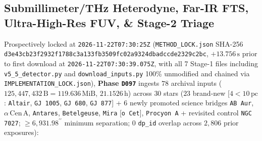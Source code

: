 \documentclass[twocolumn,10pt]{article}
\begin{document}
\subsection{Submillimeter/THz Heterodyne, Far-IR FTS, Ultra-High-Res FUV, \& Stage-2 Triage}
Prospectively locked at \texttt{2026-11-22T07:30:25Z} (\texttt{METHOD\_LOCK.json} SHA-256 \texttt{d3e43cb2\allowbreak 3f2932f1\allowbreak 788c3a13\allowbreak 3fb3509f\allowbreak c02a9324\allowbreak dbadccde\allowbreak 2329c2bc}, $+13.756\,\text{s}$ prior to first download at \texttt{2026-11-22T07:30:39.075Z}, with all 7 Stage-1 files including \texttt{v5\_5\_detector.py} and \texttt{download\_inputs.py} 100\% unmodified and chained via \texttt{IMPLEMENTATION\_LOCK.json}), \textbf{Phase \texttt{D097}} ingests $78$ archival inputs ($125{,}447{,}432\,\text{B} = 119.636\,\text{MiB}$, $21.1526\,\text{h}$) across $30$ stars ($23$ brand-new [$4 < 10\,\text{pc}$: \texttt{Altair}, \texttt{GJ\,1005}, \texttt{GJ\,680}, \texttt{GJ\,877}] + $6$ newly promoted science bridges \texttt{AB\,Aur}, $\alpha$\,Cen\,A, \texttt{Antares}, \texttt{Betelgeuse}, \texttt{Mira} [\texttt{o\,Cet}], \texttt{Procyon\,A} + revisited control \texttt{NGC\,7027}; $\ge 6{,}931.98^{\prime\prime}$ minimum separation; $0$ \texttt{dp\_id} overlap across $2{,}806$ prior exposures):
\end{document}
